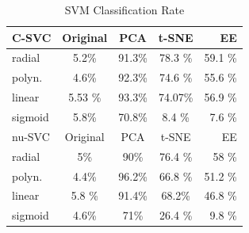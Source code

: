 \documentclass{article}
\begin{document}
\begin{table}[]
\caption{SVM Classification Rate }
\label{svmrates}
\begin{center}
\begin{small}
\begin{sc}

\begin{tabular}{lcccr}
\hline
\abovespace\belowspace
C-SVC 		& Original 	& PCA	 & t-SNE 		 & EE  \\
\hline
\abovespace
radial 		& 5.2\% 	& 91.3\% 	& 78.3 \% 	 	& 59.1 \% \\
polyn. 		& 4.6\%  	& 92.3\% 	& 74.6 \% 		& 55.6 \% \\ 
linear 		& 5.53 \%  & 93.3\% & 74.07\% 	 	& 56.9 \% \\
\belowspace
sigmoid		& 5.8\% 	& 70.8\% 	& 8.4 \% 	 	& 7.6 \% \\
\hline
\hline
\abovespace\belowspace
nu-SVC 		& Original 	& PCA	 & t-SNE 		 & EE  \\
\hline
\abovespace
radial 		& 5\% 	& 90\% 	& 76.4 \% 	 	& 58 \% \\
polyn. 		& 4.4\%  	& 96.2\% 	& 66.8 \% 		& 51.2 \% \\ 
linear 		& 5.8 \%  	& 91.4\% 	& 68.2\% 	 	& 46.8 \% \\
\belowspace
sigmoid		& 4.6\% 	& 71\% 	& 26.4 \% 	 	& 9.8 \% \\
\hline
\end{tabular}
\end{sc}
\end{small}
\end{center}
\vskip -0.1in
\end{table}

%
\end{document}
